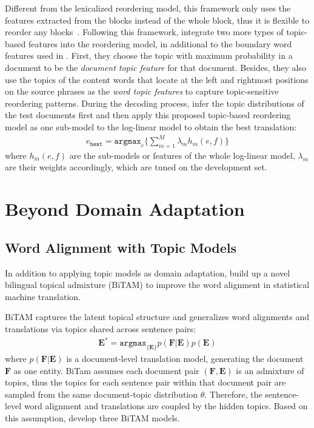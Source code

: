 Different from the lexicalized reordering model, this framework only uses the features extracted from the blocks instead of the whole block, thus it is flexible to reorder any blocks~\citep{Xiong-2006}. Following this framework, \citet{wang-14} integrate two more types of topic-based features into the reordering model, in additional to the boundary word features used in \citet{Xiong-2006}. First, they choose the topic with maximum probability in a document to be the \textit{document topic feature} for that document. Besides, they also use the topics of the content words that locate at the left and rightmost positions on the source phrases as the \textit{word topic features} to capture topic-sensitive reordering patterns. During the decoding process, \citet{Xiong-2006} infer the topic distributions of the test documents first and then apply this proposed topic-based reordering model as one sub-model to the log-linear model to obtain the best translation:
\begin{align}
e_\texttt{best} = \texttt{argmax}_e \Big \{ \sum_{m=1}^M \lambda_m h_m(e,f) \Big \}
\end{align}
where $h_m(e,f)$ are the  sub-models or features of the whole log-linear model, $\lambda_m$ are their weights accordingly, which are tuned on the development set.

\section{Beyond Domain Adaptation}

\subsection{Word Alignment with Topic Models}

In addition to applying topic models as domain adaptation, \citet{zhao-06} build up a novel bilingual topical admixture (BiTAM) to improve the word alignment in statistical machine translation.

BiTAM captures the latent topical structure and generalizes word alignments and translations via topics shared across sentence pairs:
\begin{align}
\textbf{E}^{*} = \texttt{argmax}_{\{\textbf{E}\}} p(\textbf{F} | \textbf{E})p(\textbf{E})
\end{align}
where $p(\textbf{F} | \textbf{E})$ is a document-level translation model, generating the document $\textbf{F}$ as one entity. BiTam assumes each document pair $(\textbf{F}, \textbf{E})$ is an admixture of topics, thus the topics for each sentence pair within that document pair are sampled from the same document-topic distribution $\theta$. Therefore, the sentence-level word alignment and translations are coupled by the hidden topics.  Based on this assumption, \citet{zhao-06} develop three BiTAM models.

